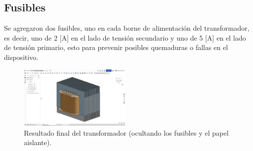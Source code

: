 \subsection{Fusibles}
Se agregaron dos fusibles, uno en cada borne de alimentación del transformador, es decir, uno de 2 [A] en el lado de tensión secundario y uno de 5 [A] en el lado de tensión primario, esto para prevenir posibles quemaduras o fallas en el dispositivo.



\begin{figure}[ht!]
    \centering
    \includegraphics[width=0.48\textwidth]{fot/T3.png}
    \caption{Resultado final del transformador (ocultando los fusibles y el papel aislante).}
    \label{fig:T3}
\end{figure}
